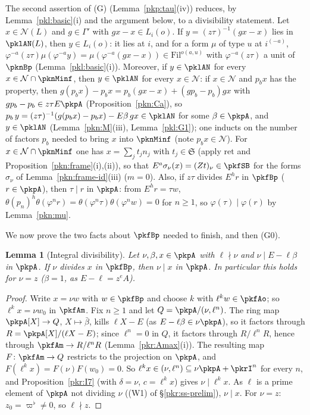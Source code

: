 \documentclass[10pt]{amsart}
\newtheorem{lemma}[theorem]{Lemma}
\theoremstyle{definition}
\theoremstyle{remark}
\begin{document}
The second assertion of (G) (Lemma~\ref{pkp:tau}(iv)) reduces, by Lemma~\ref{pkl:basic}(i) and the argument
below, to a divisibility statement. Let $x\in\mathcal N(L)$ and $g\in\Gamma'$ with $gx-x\in L_i(o)$. If
$y=(z\tau)^{-1}(gx-x)$ lies in $\pklAN(L)$, then $y\in L_i(o)$: it lies at $i$, and for a form $\mu$ of type $u$
at $i^{(-a)}$, $\varphi^{-a}(z\tau)\mu(\varphi^{-a}y)=\mu(\varphi^{-a}(gx-x))\in\mathrm{Fil}^{o(a,u)}$ with
$\varphi^{-a}(z\tau)$ a unit of $\pknBp$ (Lemma~\ref{pkl:basic}(i)). Moreover, if $y\in\pklAN$ for every
$x\in\mathcal N\cap\pknMinf$, then $y\in\pklAN$ for every $x\in\mathcal N$: if $x\in\mathcal N$ and $p_bx$ has the
property, then $g(p_bx)-p_bx=p_b(gx-x)+(gp_b-p_b)gx$ with $gp_b-p_b\in z\tau E\pkpA$ (Proposition~\ref{pkn:Ca}), so
$p_b\,y=(z\tau)^{-1}(g(p_bx)-p_bx)-E\beta\,gx\in\pklAN$ for some $\beta\in\pkpA$, and $y\in\pklAN$
(Lemma~\ref{pkn:M}(iii), Lemma~\ref{pkl:G1}); one inducts on the number of factors $p_b$ needed to bring $x$ into
$\pknMinf$ (note $p_bx\in\mathcal N$). For $x\in\mathcal N\cap\pknMinf$ one has $x=\sum_jt_jn_j$ with $t_j\in\mathfrak S$
(apply $\mathrm{ret}$ and Proposition~\ref{pkn:frame}(i),(ii)), so that $E^a\sigma_\nu(x)=(Zt)_\nu\in\pkfSB$ for the
forms $\sigma_\nu$ of Lemma~\ref{pkn:frame-id}(iii) ($m=0$). Also, if $z\tau$ divides $E^hr$ in $\pkfBp$
($r\in\pkpA$), then $\tau\mid r$ in $\pkpA$: from $E^hr=\tau w$, $\theta(p_n)^h\theta(\varphi^nr)=
\theta(\varphi^n\tau)\theta(\varphi^nw)=0$ for $n\ge1$, so $\varphi(\tau)\mid\varphi(r)$ by Lemma~\ref{pkn:mu}.

We now prove the two facts about $\pkfBp$ needed to finish, and then (G0).

\begin{lemma}[Integral divisibility]\label{pkl:intdiv}
Let $\nu,\beta,x\in\pkpA$ with $\ell\nmid\nu$ and $\nu\mid E-\ell\beta$ in $\pkpA$. If $\nu$ divides $x$ in $\pkfBp$, then
$\nu\mid x$ in $\pkpA$. In particular this holds for $\nu=z$ ($\beta=1$, as $E-\ell=z^eA$).
\end{lemma}

\begin{proof}
Write $x=\nu w$ with $w\in\pkfBp$ and choose $k$ with $\ell^kw\in\pkfAo$; so $\ell^kx=\nu w_0$ in $\pkfAm$. Fix $n\ge1$
and let $Q=\pkpA/(\nu,\ell^n)$. The ring map $\pkpA[X]\to Q$, $X\mapsto\bar\beta$, kills $\ell X-E$ (as
$E-\ell\beta\in\nu\pkpA$), so it factors through $R=\pkpA[X]/(\ell X-E)$; since $\ell^n=0$ in $Q$, it factors through
$R/\ell^nR$, hence through $\pkfAm\to R/\ell^nR$ (Lemma~\ref{pkr:Amax}(i)). The resulting map $F\colon\pkfAm\to Q$
restricts to the projection on $\pkpA$, and $F(\ell^kx)=F(\nu)F(w_0)=0$. So $\ell^kx\in(\nu,\ell^n)\subseteq\nu\pkpA+
\pkrI^n$ for every $n$, and Proposition~\ref{pkr:I7} (with $\delta=\nu$, $c=\ell^kx$) gives $\nu\mid\ell^kx$. As $\ell$ is a
prime element of $\pkpA$ not dividing $\nu$ ((W1) of \S\ref{pkr:ss-prelim}), $\nu\mid x$. For $\nu=z$: $z_0=\varpi^\flat\ne0$,
so $\ell\nmid z$.
\end{proof}
\end{document}
